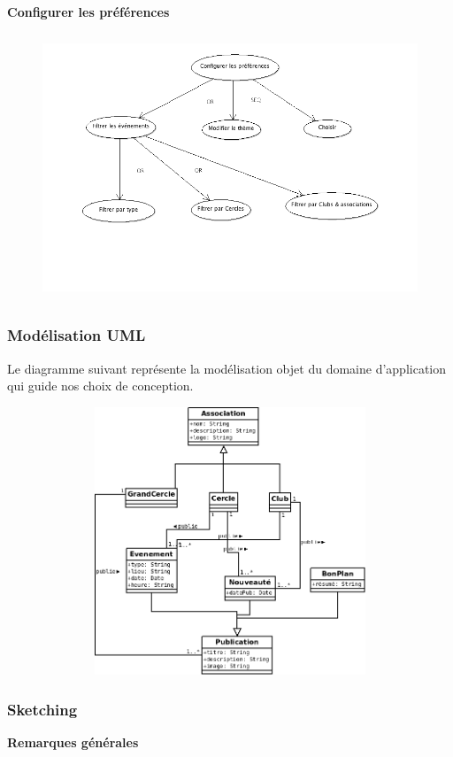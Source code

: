 \documentclass[a4paper, 11px]{article}
\begin{document}
\vfill
\clearpage
\vfil
\textbf{Configurer les préférences}
\begin{figure}[h]
\includegraphics[width = \textwidth,height=8cm]{configurer_preferences.png}
\end{figure}
\subsubsection{Modélisation UML}
Le diagramme suivant représente la modélisation objet du domaine d'application qui guide nos choix de conception.
\begin{figure}[h]
\includegraphics[width = 12cm,height=8cm]{classes.png}
\end{figure}

\vfill
\clearpage

\subsubsection{Sketching}
\textbf{Remarques générales}
\end{document}
